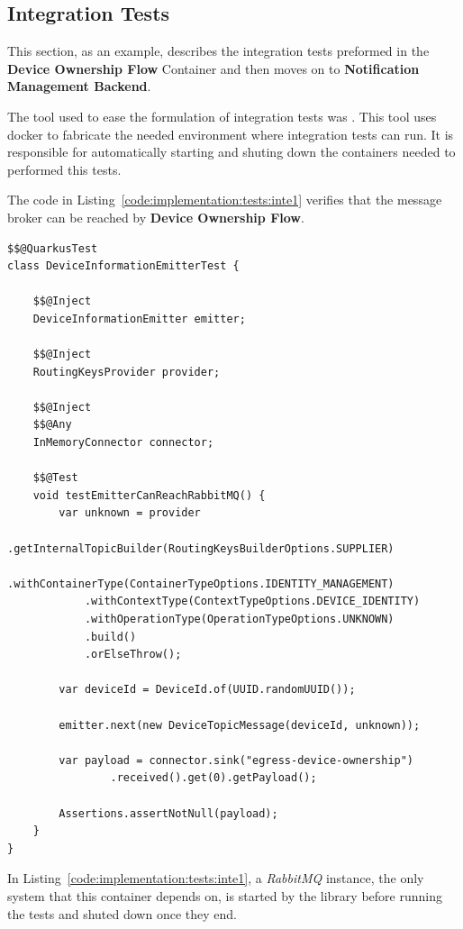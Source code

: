 \subsection{Integration Tests}
\label{subsec:implementation:tests:integration}

This section, as an example, describes the integration tests preformed in the \textbf{Device Ownership Flow} Container and then moves on to \textbf{Notification Management Backend}.

The tool used to ease the formulation of integration tests was . This tool uses docker to fabricate the needed environment where integration tests can run. It is responsible for automatically starting and shuting down the containers needed to performed this tests.

The code in Listing~\ref{code:implementation:tests:inte1} verifies that the message broker can be reached by \textbf{Device Ownership Flow}.

\begin{lstlisting}[style=Java, caption=Integration Test - Message Broker - Device Ownership Flow, label={code:implementation:tests:inte1}]
$$@QuarkusTest
class DeviceInformationEmitterTest {

    $$@Inject
    DeviceInformationEmitter emitter;

    $$@Inject
    RoutingKeysProvider provider;

    $$@Inject
    $$@Any
    InMemoryConnector connector;

    $$@Test
    void testEmitterCanReachRabbitMQ() {
        var unknown = provider
            .getInternalTopicBuilder(RoutingKeysBuilderOptions.SUPPLIER)
            .withContainerType(ContainerTypeOptions.IDENTITY_MANAGEMENT)
            .withContextType(ContextTypeOptions.DEVICE_IDENTITY)
            .withOperationType(OperationTypeOptions.UNKNOWN)
            .build()
            .orElseThrow();

        var deviceId = DeviceId.of(UUID.randomUUID());

        emitter.next(new DeviceTopicMessage(deviceId, unknown));

        var payload = connector.sink("egress-device-ownership")
                .received().get(0).getPayload();

        Assertions.assertNotNull(payload);
    }
}
\end{lstlisting}

In Listing~\ref{code:implementation:tests:inte1}, a \textit{RabbitMQ} instance, the only system that this container depends on, is started by the  library before running the tests and shuted down once they end.

